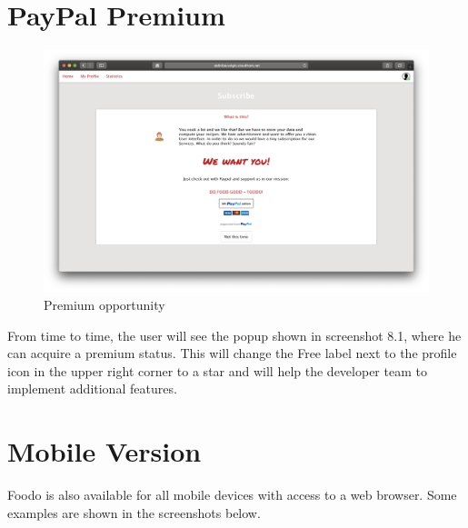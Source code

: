 \section*{PayPal Premium}
\vspace{-2em}
\begin{figure}[H]
	\captionsetup{justification=centering}
	\begin{center}
		\includegraphics[scale=0.25]{Ressourcen/img/screenshots/screenshotR.png}
		\vspace{-2em}
		\caption{Premium opportunity}
	\end{center}
\end{figure}
From time to time, the user will see the popup shown in screenshot 8.1, where he can acquire a premium status. This will change the Free label next to the profile icon in the upper right corner to a star and will help the developer team to implement additional features.
\clearpage
\section*{Mobile Version}
Foodo is also available for all mobile devices with access to a web browser. Some examples are shown in the screenshots below.

